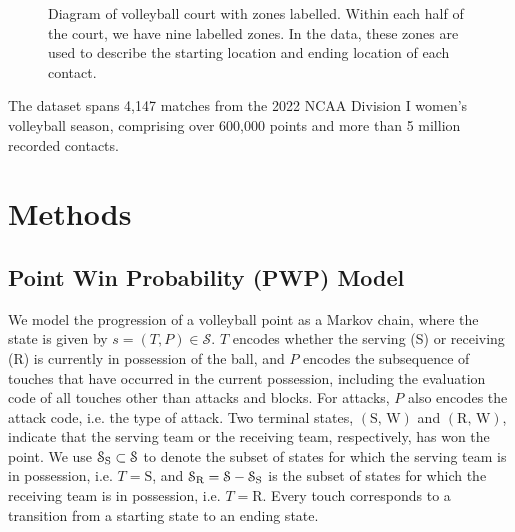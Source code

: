 \documentclass[USenglish]{article}
\theoremstyle{dgthm}
\theoremstyle{dgdef}
\begin{document}
\begin{figure}
    \centering
    \caption{Diagram of volleyball court with zones labelled. Within each half of the court, we have nine labelled zones. In the data, these zones are used to describe the starting location and ending location of each contact.}
    \label{fig:volleyball-court-diagram}
\end{figure}

The dataset spans 4,147 matches from the 2022 NCAA Division I women's volleyball season, comprising over 600,000 points and more than 5 million recorded contacts.


\section{Methods}

\subsection{Point Win Probability (PWP) Model}
\label{sec:point-win-prob}

We model the progression of a volleyball point as a Markov chain, where the state is given by $s = (T, P) \in \mathcal{S}$. $T$ encodes whether the serving (S) or receiving (R) is currently in possession of the ball, and $P$ encodes the subsequence of touches that have occurred in the current possession, including the evaluation code of all touches other than attacks and blocks. For attacks, $P$ also encodes the attack code, i.e. the type of attack. Two terminal states, $(\mbox{S, W})$ and $(\mbox{R, W})$, indicate that the serving team or the receiving team, respectively, has won the point. We use $\mathcal{S}_{\mbox{\scriptsize S}} \subset \mathcal{S}$ to denote the subset of states for which the serving team is in possession, i.e. $T = \mbox{S}$, and $\mathcal{S}_{\mbox{\scriptsize R}} = \mathcal{S} - \mathcal{S}_{\mbox{\scriptsize S}}$ is the subset of states for which the receiving team is in possession, i.e. $T = \mbox{R}$. Every touch corresponds to a transition from a starting state to an ending state.
\end{document}
